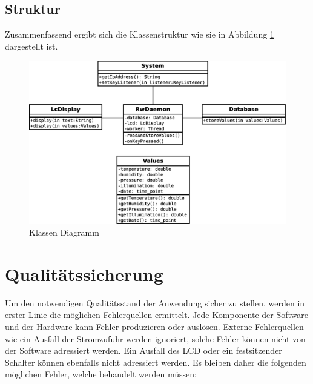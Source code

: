 \documentclass[
    10pt,
    a4paper,
]{scrartcl}
\begin{document}
\subsection{Struktur}


Zusammenfassend ergibt sich die Klassenstruktur wie sie in Abbildung
\ref{fig:class-diagram} dargestellt ist.

\begin{figure}[ht]
    \centering
    \includegraphics[width=\textwidth]{class-diagram.eps}
    \caption{Klassen Diagramm}
    \label{fig:class-diagram}
\end{figure}

\section{Qualitätssicherung}
Um den notwendigen Qualitätsstand der Anwendung sicher zu stellen, werden in erster Linie
die möglichen Fehlerquellen ermittelt. Jede Komponente der Software und der Hardware kann
Fehler produzieren oder auslösen. Externe Fehlerquellen wie ein Ausfall der Stromzufuhr
werden ignoriert, solche Fehler können nicht von der Software adressiert werden. Ein
Ausfall des LCD oder ein festsitzender Schalter können ebenfalls nicht adressiert werden.
Es bleiben daher die folgenden möglichen Fehler, welche behandelt werden müssen:
\end{document}
